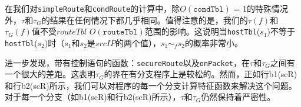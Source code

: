 在我们对\texttt{simpleRoute}和\texttt{condRoute}的计算中，除$O(\texttt{condTbl})$ = 1的特殊情况外，$\tau$和$\tau_G$的结果在任何情况下都几乎相同。值得注意的是，我们的$\tau(f)$和$\tau_G(f)$值不受$routeTbl$ $O(\texttt{routeTbl})$范围的影响。这说明当\texttt{hostTbl}($s_1$)不等于\texttt{hostTbl}($s_2$)时（$s_1$和$s_2$是$srcIP$的两个值），$s_1 \sim_f s_2$的概率非常小。



进一步发现，带有控制语句的函数：\texttt{secureRoute}以及\texttt{onPacket}，在$\tau$和$\tau_G$之间有一个很大的差距。这表明$\tau_G$的界在有分支程序上是较松的。然而，正如行b1(scR)和行b2(scR)所示，我们可以对程序的每一个分支计算特征函数来解决这个问题。对于每一个分支（如b1(scR)和行b2(scR)所示），$\tau$和$\tau_G$仍然保持着严密性。


